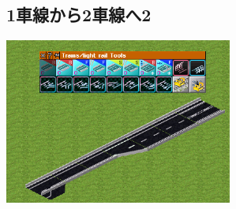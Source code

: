 \documentclass{jbook}
\begin{document}
\newpage

\subsection{1車線から2車線へ2}
\label{sub:1lane_to_2lane2}

\includegraphics[width = 75mm]{picture/20210214-road-5-5.png}

\vspace{10pt}
\end{document}
